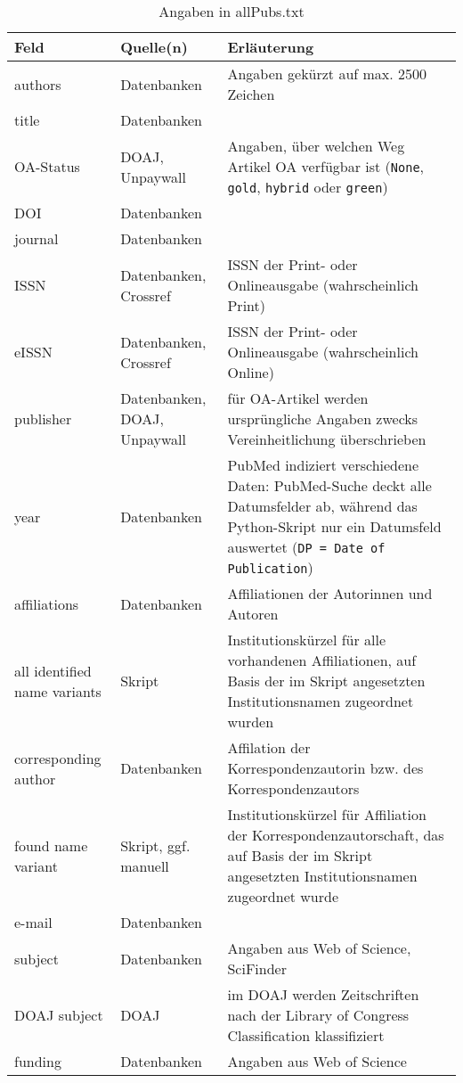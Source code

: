 \begin{appendices}
\begin{table}[h] \small
\caption{Angaben in allPubs.txt} \label{tab:art-data}
    \begin{tabularx}{1\textwidth}{p{3cm}p{2.5cm}p{8cm}} 
    \toprule
     Feld & Quelle(n) & Erläuterung \\
     \midrule
	authors & Datenbanken & Angaben gekürzt auf max. 2500 Zeichen \\
 	title & Datenbanken & \\
	OA-Status & DOAJ, Unpaywall & Angaben, über welchen Weg Artikel OA verfügbar ist (\texttt{None}, \texttt{gold}, \texttt{hybrid} oder \texttt{green}) \\
	DOI & Datenbanken & \\
 	journal & Datenbanken &  \\
	ISSN & Datenbanken, Crossref & ISSN der Print- oder Onlineausgabe (wahrscheinlich Print)\\
	eISSN & Datenbanken, Crossref & ISSN der Print- oder Onlineausgabe (wahrscheinlich Online)\\
	publisher & Datenbanken, DOAJ, \mbox{Unpaywall} & für OA-Artikel werden ursprüngliche Angaben zwecks Vereinheitlichung überschrieben\\
	year & Datenbanken & PubMed indiziert verschiedene Daten: PubMed-Suche deckt alle Datumsfelder ab, während das Python-Skript nur ein Datumsfeld auswertet (\texttt{DP = Date of Publication})\\
	affiliations & Datenbanken & Affiliationen der Autorinnen und Autoren\\
	all identified name variants & Skript & Institutionskürzel für alle vorhandenen Affiliationen, auf Basis der im Skript angesetzten Institutionsnamen zugeordnet wurden \\
	corresponding author & Datenbanken & Affilation der Korrespondenzautorin bzw. des Korrespondenzautors\\
	found name variant & Skript, ggf. manuell & Institutionskürzel für Affiliation der  Korrespondenzautorschaft, das auf Basis der im Skript angesetzten Institutionsnamen zugeordnet wurde\\
	e-mail & Datenbanken & \\
	subject & Datenbanken & Angaben aus Web of Science, SciFinder \\
	DOAJ subject & DOAJ & im DOAJ werden Zeitschriften nach der Library of Congress Classification klassifiziert\\
	funding & Datenbanken & Angaben aus Web of Science \\

\end{tabularx}
\end{table}
\end{appendices}
